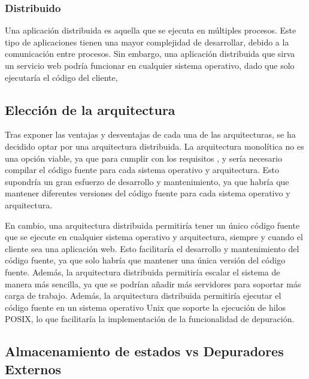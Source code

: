 \subsubsection{Distribuido} \label{subsubsec:distribuido}

Una \gls{aplicación distribuida} \cite {DistributedSystems} es aquella que se ejecuta en múltiples \glspl{proceso}. Este tipo de aplicaciones tienen una mayor complejidad de desarrollar, debido a la comunicación entre \glspl{proceso}. Sin embargo, una \gls{aplicación distribuida} que sirva un \gls{servicio web} podría funcionar en cualquier sistema operativo, dado que solo ejecutaría el código del cliente,

\subsection{Elección de la arquitectura} \label{subsec:eleccion-arquitectura}

Tras exponer las ventajas y desventajas de cada una de las arquitecturas, se ha decidido optar por una arquitectura distribuida. La arquitectura monolítica no es una opción viable, ya que para cumplir con los requisitos ,  y  sería necesario compilar el \gls{código fuente} para cada sistema operativo y arquitectura. Esto supondría un gran esfuerzo de desarrollo y mantenimiento, ya que habría que mantener diferentes versiones del \gls{código fuente} para cada sistema operativo y arquitectura.

En cambio, una arquitectura distribuida permitiría tener un único \gls{código fuente} que se ejecute en cualquier sistema operativo y arquitectura, siempre y cuando el cliente sea una \gls{aplicación web}. Esto facilitaría el desarrollo y mantenimiento del \gls{código fuente}, ya que solo habría que mantener una única versión del \gls{código fuente}. Además, la arquitectura distribuida permitiría escalar el sistema de manera más sencilla, ya que se podrían añadir más servidores para soportar más carga de trabajo.
Además, la arquitectura distribuida permitiría ejecutar el \gls{código fuente} en un sistema operativo \gls{Unix} que soporte la ejecución de \glspl{hilo} POSIX, lo que facilitaría la implementación de la funcionalidad de depuración.

\subsection{Almacenamiento de estados vs Depuradores Externos} \label{subsec:depuracion}

